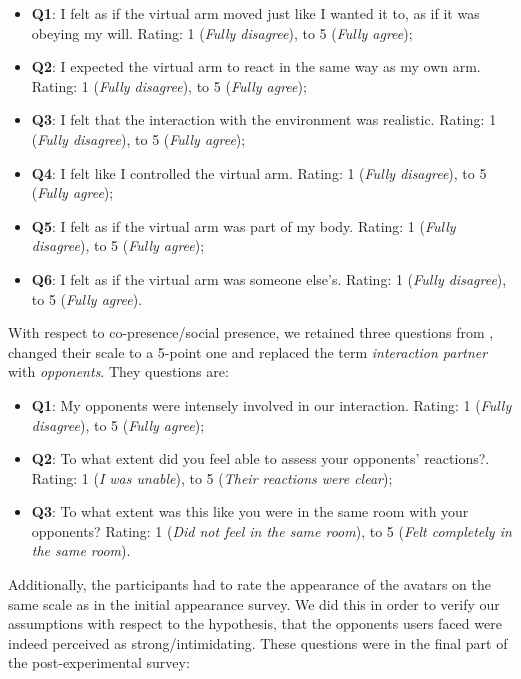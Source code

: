 \begin{itemize}
\label{enum:presenceQuestions}
\itemsep0em
    \item \textbf{Q1}: I felt as if the virtual arm moved just like I wanted it to, as if it was obeying my will. Rating: 1 (\textit{Fully disagree}), to 5 (\textit{Fully agree});
    \item \textbf{Q2}: I expected the virtual arm to react in the same way as my own arm. Rating: 1 (\textit{Fully disagree}), to 5 (\textit{Fully agree});
    \item \textbf{Q3}: I felt that the interaction with the environment was realistic. Rating: 1 (\textit{Fully disagree}), to 5 (\textit{Fully agree});
    \item \textbf{Q4}: I felt like I controlled the virtual arm. Rating: 1 (\textit{Fully disagree}), to 5 (\textit{Fully agree});
    \item \textbf{Q5}: I felt as if the virtual arm was part of my body. Rating: 1 (\textit{Fully disagree}), to 5 (\textit{Fully agree});
    \item \textbf{Q6}: I felt as if the virtual arm was someone else’s. Rating: 1 (\textit{Fully disagree}), to 5 (\textit{Fully agree}).
\end{itemize}
With respect to co-presence/social presence, we retained three questions from \cite{nowak2003effect}, changed their scale to a 5-point one and replaced the term \textit{interaction partner} with \textit{opponents}. They questions are:
\begin{itemize}
\itemsep0em
    \item \textbf{Q1}: My opponents were intensely involved in our interaction. Rating: 1 (\textit{Fully disagree}), to 5 (\textit{Fully agree});
    \item \textbf{Q2}: To what extent did you feel able to assess your opponents’ reactions?. Rating: 1 (\textit{I was unable}), to 5 (\textit{Their reactions were clear});
    \item \textbf{Q3}: To what extent was this like you were in the same room with your opponents? Rating: 1 (\textit{Did not feel in the same room}), to 5 (\textit{Felt completely in the same room}).
\end{itemize}
Additionally, the participants had to rate the appearance of the avatars on the same scale as in the initial appearance survey. We did this in order to verify our assumptions with respect to the hypothesis, that the opponents users faced were indeed perceived as strong/intimidating. These questions were in the final part of the post-experimental survey:
